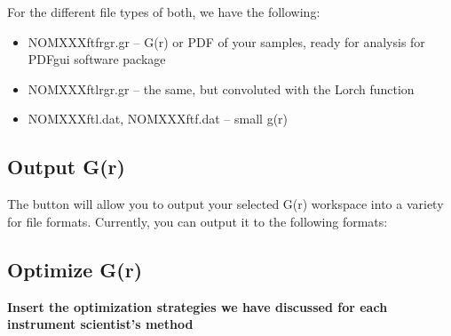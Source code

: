 For the different file types of both, we have the following:

\begin{itemize}

\item NOMXXXftfrgr.gr – G(r) or PDF of your samples, ready for
analysis for PDFgui software package

\item NOMXXXftlrgr.gr – the same, but convoluted with the
Lorch function 

\item NOMXXXftl.dat, NOMXXXftf.dat – small g(r)

\end{itemize}


\subsection{Output G(r)}
The  button will allow you to output your selected G(r) workspace into a variety for file formats. Currently, you can output it to the following formats:

\noindent{}


\subsection{Optimize G(r)}

\textbf{Insert the optimization strategies we have discussed for each instrument scientist's method}


